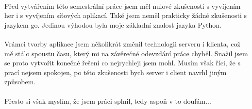 \documentclass[12pt, a4paper]{article}
\begin{document}
\paragraph{}
Před vytvářením této semestrální práce jsem měl nulové zkušenosti s vyvíjením her i s vyvíjením síťových aplikací.
Také jsem neměl prakticky žádné zkušenosti s jazykem go. Jedinou výhodou byla moje základní znalost jazyka Python.

\paragraph{}
Vrámci tvorby aplikace jsem několikrát změnil technologii serveru i klienta, což mě stálo spoustu času, který mi na
závěrečné odevzdání práce chyběl. Snažil jsem se proto vytvořit konečné řešení co nejrychleji jsem mohl. Musím však
říci, že s prací nejsem spokojen, po této zkušenosti bych server i client navrhl jiným způsobem.

\paragraph{}
Přesto si však myslím, že jsem práci splnil, tedy aspoň v to doufám...

\paragraph{}

\newpage
\listoftables
\end{document}
